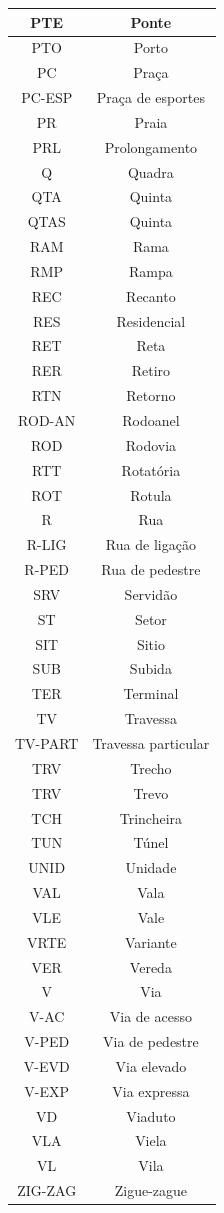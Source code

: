 \documentclass[
	12pt,				%
	oneside,			%
	a4paper,			%
	english,			%
	brazil				%
	]{abntex2ppgsi}
\begin{document}
{{\begin{apendicesenv}
\begin{longtable}{c|c}
\hline
PTE & Ponte \\
\hline
PTO & Porto \\
\hline
PC & Praça \\
\hline
PC-ESP & Praça de esportes \\
\hline
PR & Praia \\
\hline
PRL & Prolongamento \\
\hline
Q & Quadra \\
\hline
QTA & Quinta \\
\hline
QTAS & Quinta \\
\hline
RAM & Rama \\
\hline
RMP & Rampa \\
\hline
REC & Recanto \\
\hline
RES & Residencial \\
\hline
RET & Reta \\
\hline
RER & Retiro \\
\hline
RTN & Retorno \\
\hline
ROD-AN & Rodoanel \\
\hline
ROD & Rodovia \\
\hline
RTT & Rotatória \\
\hline
ROT & Rotula \\
\hline
R & Rua \\
\hline
R-LIG & Rua de ligação \\
\hline
R-PED & Rua de pedestre \\
\hline
SRV & Servidão \\
\hline
ST & Setor \\
\hline
SIT & Sitio \\
\hline
SUB & Subida \\
\hline
TER & Terminal \\
\hline
TV & Travessa \\
\hline
TV-PART & Travessa particular \\
\hline
TRV & Trecho \\
\hline
TRV & Trevo \\
\hline
TCH & Trincheira \\
\hline
TUN & Túnel \\
\hline
UNID & Unidade \\
\hline
VAL & Vala \\
\hline
VLE & Vale \\
\hline
VRTE & Variante \\
\hline
VER & Vereda \\
\hline
V & Via \\
\hline
V-AC & Via de acesso \\
\hline
V-PED & Via de pedestre \\
\hline
V-EVD & Via elevado \\
\hline
V-EXP & Via expressa \\
\hline
VD & Viaduto \\
\hline
VLA & Viela \\
\hline
VL & Vila \\
\hline
ZIG-ZAG & Zigue-zague \\


\end{longtable}
\end{apendicesenv}}}
\end{document}
